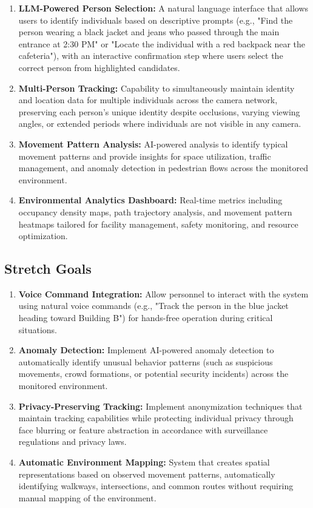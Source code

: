 \begin{enumerate}[leftmargin=80pt]
    \item \textbf{LLM-Powered Person Selection:} A natural language interface that allows users to identify individuals based on descriptive prompts (e.g., "Find the person wearing a black jacket and jeans who passed through the main entrance at 2:30 PM" or "Locate the individual with a red backpack near the cafeteria"), with an interactive confirmation step where users select the correct person from highlighted candidates.
    \item \textbf{Multi-Person Tracking:} Capability to simultaneously maintain identity and location data for multiple individuals across the camera network, preserving each person's unique identity despite occlusions, varying viewing angles, or extended periods where individuals are not visible in any camera.
    \item \textbf{Movement Pattern Analysis:} AI-powered analysis to identify typical movement patterns and provide insights for space utilization, traffic management, and anomaly detection in pedestrian flows across the monitored environment.
    \item \textbf{Environmental Analytics Dashboard:} Real-time metrics including occupancy density maps, path trajectory analysis, and movement pattern heatmaps tailored for facility management, safety monitoring, and resource optimization.
\end{enumerate}

\subsection{Stretch Goals}
\label{subsection:stretch-goals}

\begin{enumerate}[leftmargin=80pt]
    \item \textbf{Voice Command Integration:} Allow personnel to interact with the system using natural voice commands (e.g., "Track the person in the blue jacket heading toward Building B") for hands-free operation during critical situations.
    \item \textbf{Anomaly Detection:} Implement AI-powered anomaly detection to automatically identify unusual behavior patterns (such as suspicious movements, crowd formations, or potential security incidents) across the monitored environment.
    \item \textbf{Privacy-Preserving Tracking:} Implement anonymization techniques that maintain tracking capabilities while protecting individual privacy through face blurring or feature abstraction in accordance with surveillance regulations and privacy laws.
    \item \textbf{Automatic Environment Mapping:} System that creates spatial representations based on observed movement patterns, automatically identifying walkways, intersections, and common routes without requiring manual mapping of the environment.
\end{enumerate}


